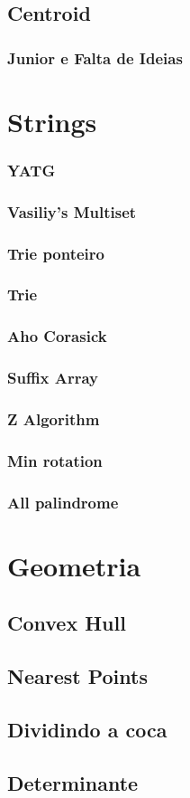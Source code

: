 \documentclass[a4paper,12pt]{article}
\newcommand\includes[4]{
   \subsection{#2}
   
}
\newcommand\includess[4]{
   \subsubsection{#2}
   
}
\begin{document}
\begin{multicols}{2}
\subsection{Centroid}
\includess{c++}{Junior e Falta de Ideias}{graph}{centroid_decomp.cpp}

\section{Strings}
\includess{c++}{YATG}{strings}{YATG.cpp}
\includess{c++}{Vasiliy's Multiset}{strings}{multiset.cpp}
\includess{c++}{Trie ponteiro}{strings}{trie_ponteiro.cpp}
\includess{c++}{Trie}{strings}{trieXor.cpp}
\includess{c++}{Aho Corasick}{strings}{aho-corasick.cpp}
\includess{c++}{Suffix Array}{strings}{suffix_array.cpp}
\includess{c++}{Z Algorithm}{strings}{z_algo.cpp}
\includess{c++}{Min rotation}{strings}{min_rot.cpp}
\includess{c++}{All palindrome}{strings}{all_palindrome.cpp}

\section{Geometria}
\includes{c++}{Convex Hull}{math}{convexhull.cpp}
\includes{c++}{Nearest Points}{math}{near.cpp}
\includes{c++}{Dividindo a coca}{geometria}{coca.cpp}
\includes{c++}{Determinante}{geometria}{det.cpp}


\end{multicols}
\end{document}
